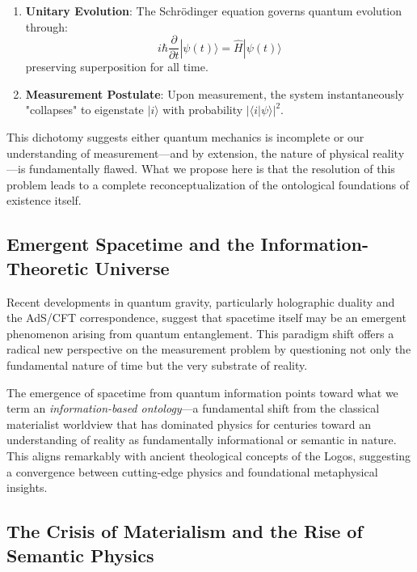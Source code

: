 \documentclass[12pt,a4paper]{article}
\newcommand{\ket}[1]{|#1\rangle}
\newcommand{\braket}[2]{\langle#1|#2\rangle}
\newcommand{\op}[1]{\hat{#1}}
\begin{document}
\begin{enumerate}
    \item \textbf{Unitary Evolution}: The Schrödinger equation governs quantum evolution through:
    \begin{equation}
        i\hbar\frac{\partial}{\partial t}\ket{\psi(t)} = \op{H}\ket{\psi(t)}
    \end{equation}
    preserving superposition for all time.
    
    \item \textbf{Measurement Postulate}: Upon measurement, the system instantaneously "collapses" to eigenstate $\ket{i}$ with probability $|\braket{i}{\psi}|^2$.
\end{enumerate}

This dichotomy suggests either quantum mechanics is incomplete or our understanding of measurement—and by extension, the nature of physical reality—is fundamentally flawed. What we propose here is that the resolution of this problem leads to a complete reconceptualization of the ontological foundations of existence itself.

\subsection{Emergent Spacetime and the Information-Theoretic Universe}

Recent developments in quantum gravity, particularly holographic duality and the AdS/CFT correspondence, suggest that spacetime itself may be an emergent phenomenon arising from quantum entanglement. This paradigm shift offers a radical new perspective on the measurement problem by questioning not only the fundamental nature of time but the very substrate of reality.

The emergence of spacetime from quantum information points toward what we term an \emph{information-based ontology}—a fundamental shift from the classical materialist worldview that has dominated physics for centuries toward an understanding of reality as fundamentally informational or semantic in nature. This aligns remarkably with ancient theological concepts of the Logos, suggesting a convergence between cutting-edge physics and foundational metaphysical insights.

\subsection{The Crisis of Materialism and the Rise of Semantic Physics}
\end{document}
